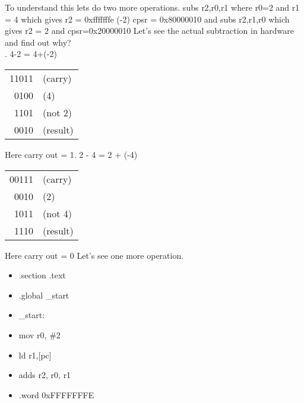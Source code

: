 \documentclass{article}
\begin{document}
	To understand this lets do two more operations.\newline
	subs r2,r0,r1 where r0=2 and r1 = 4\newline
	which gives\newline
	r2 = 0xfffffffe (-2)\newline
	cpsr = 0x80000010\newline
	and\newline
	subs r2,r1,r0\newline
	which gives\newline
	r2 = 2\newline
	and\newline
	cpsr=0x20000010\newline
	Let's see the actual subtraction in hardware and find out why?\\
	. 4-2 = 4+(-2)\newline \newline
	\begin{tabular}{r l}
		11011 & (carry)\\
		0100 & (4)\\
		1101 & (not 2)\\
		0010 & (result)
	\end{tabular}\newline \newline
	Here carry out = 1\newline {}. 2 - 4 = 2 + (-4)\newline \newline
	\begin{tabular}{r l}
		00111 & (carry)\\
		0010 & (2)\\
		1011 & (not 4)\\
		1110 & (result)
	\end{tabular}\newline \newline
	Here carry out = 0\newline \newline
	Let's see one more operation.\newline
	\begin{itemize}
		\item[] .section .text
		\item[] .global \_start
		\item[] \_start:
		\item[]\qquad mov r0, \#2
		\item[]\qquad ld r1,[pc] 
		\item[]\qquad adds r2, r0, r1
		\item[]\qquad .word 0xFFFFFFFE
	\end{itemize}
\end{document}
